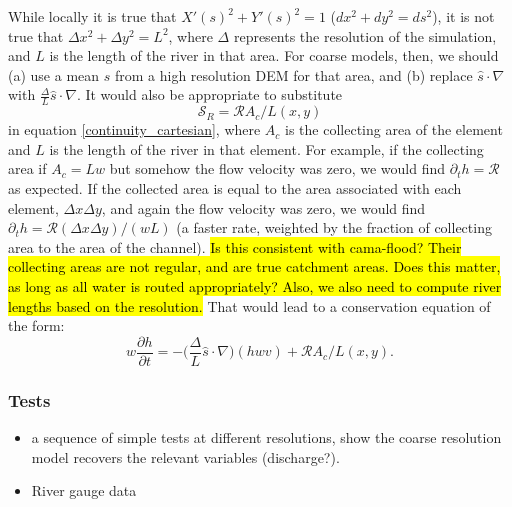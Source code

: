 \documentclass[twoside,10pt]{report}
\begin{document}

While locally it is true that $X'(s)^2+Y'(s)^2 = 1$ ($dx^2+dy^2 = ds^2$), it is not true that $\Delta x^2+\Delta y^2 = L^2$, where $\Delta$ represents the resolution of the simulation, and $L$ is the length of the river in that area.  For coarse models, then, we should (a) use a mean $\hat{s}$ from a high resolution DEM for that area, and (b) replace $\hat{s} \cdot \nabla$ with $\frac{\Delta}{L}\hat{s} \cdot \nabla$. It would also be appropriate to substitute
\begin{equation}
    \mathcal{S}_R = \mathcal{R} A_c/L(x,y)
\end{equation}
in equation \eqref{continuity_cartesian}, where $A_c$ is the collecting area of the element and $L$ is the length of the river in that element. For example, if the collecting area if $A_c = Lw$ but somehow the flow velocity was zero, we would find $\partial_t h = \mathcal{R}$ as expected. If the collected area is equal to the area associated with each element, $\Delta x \Delta y$, and again the flow velocity was zero, we would find $\partial_t h = \mathcal{R} (\Delta x\Delta y)/(w L)$ (a faster rate, weighted by the fraction of collecting area to the area of the channel). \hl{Is this consistent with cama-flood? Their collecting areas are not regular, and are true catchment areas. Does this matter, as long as all water is routed appropriately? Also, we also need to compute river lengths based on the resolution.} 
That would lead to a conservation equation of the form:
\begin{equation}\label{continuity_cartesian_coarse}
    w\frac{\partial h}{\partial t}  = -\bigg(\frac{\Delta}{L}\hat{s} \cdot \nabla\bigg) (hwv) + \mathcal{R} A_c/L(x,y).
\end{equation}
\subsubsection{Tests}
\begin{itemize}
    \item a sequence of simple tests at different resolutions, show the coarse resolution model recovers the relevant variables (discharge?).
    \item River gauge data
\end{itemize}
\end{document}
